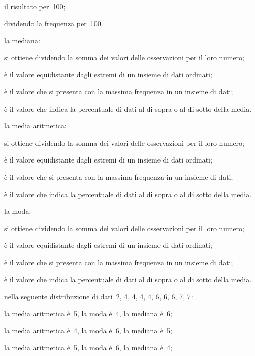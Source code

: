 \begin{esercizio}
\begin{enumerate*}
\begin{enumeratea}
il risultato per~100;
\item dividendo la frequenza per~100.
 \end{enumeratea}
\item la mediana:
 \begin{enumeratea}
\item si ottiene dividendo la somma dei valori delle osservazioni per il 
loro 
numero;
\item è il valore equidistante dagli estremi di un insieme di dati ordinati;
\item è il valore che si presenta con la massima frequenza in un insieme di 
dati;
\item è il valore che indica la percentuale di dati al di sopra o al di 
sotto della media.
 \end{enumeratea}
\item la media aritmetica:
 \begin{enumeratea}
 \item si ottiene dividendo la somma dei valori delle osservazioni per il 
loro 
numero;
\item è il valore equidistante dagli estremi di un insieme di dati ordinati;
\item è il valore che si presenta con la massima frequenza in un insieme di 
dati;
\item è il valore che indica la percentuale di dati al di sopra o al di 
sotto della media.
 \end{enumeratea}
\item la moda:
 \begin{enumeratea}
\item si ottiene dividendo la somma dei valori delle osservazioni per il 
loro 
numero;
\item è il valore equidistante dagli estremi di un insieme di dati ordinati;
\item è il valore che si presenta con la massima frequenza in un insieme di 
dati;
\item è il valore che indica la percentuale di dati al di sopra o al di 
sotto della media.
 \end{enumeratea}
\item nella seguente distribuzione di dati~2, 4, 4, 4, 4, 6, 6, 6, 7, 7:
 \begin{enumeratea}
\item la media aritmetica è~5, la moda è~4, la mediana è~6;
\item la media aritmetica è~4, la moda è~6, la mediana è~5;
\item la media aritmetica è~5, la moda è~6, la mediana è~4;

\end{enumeratea}
\end{enumerate*}
\end{esercizio}

